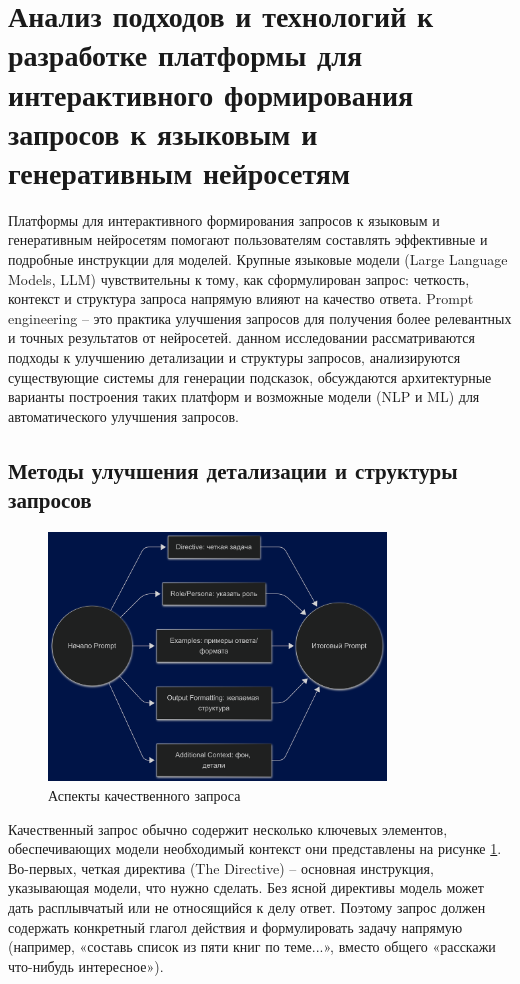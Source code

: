 \section{Анализ подходов и технологий к разработке платформы
для интерактивного формирования запросов к языковым и генеративным
нейросетям}
\label{sec:analysis}
Платформы для интерактивного формирования запросов к языковым и генеративным нейросетям помогают пользователям составлять эффективные и подробные инструкции для моделей. Крупные языковые модели (Large Language Models, LLM) чувствительны к тому, как сформулирован запрос: четкость, контекст и структура запроса напрямую влияют на качество ответа. Prompt engineering – это практика улучшения запросов для получения более релевантных и точных результатов от нейросетей\cite{lakera:2025}. данном исследовании рассматриваются подходы к улучшению детализации и структуры запросов, анализируются существующие системы для генерации подсказок, обсуждаются архитектурные варианты построения таких платформ и возможные модели (NLP и ML) для автоматического улучшения запросов.
\subsection{Методы улучшения детализации и структуры запросов}
\begin{figure}[htbp]
    \centering
    \includegraphics[width=0.8\textwidth]{picture/diploma_prompt_structure.png}
    \caption{Аспекты качественного запроса}
    \label{prompt_quality_props}
\end{figure}
Качественный запрос обычно содержит несколько ключевых элементов, обеспечивающих модели необходимый контекст\cite{learnprompt:promptstructure} они представлены на рисунке \ref{prompt_quality_props}. 
Во-первых, четкая директива (The Directive) – основная инструкция, указывающая модели, что нужно сделать.
Без ясной директивы модель может дать расплывчатый или не относящийся к делу ответ\cite{learnprompt:promptstructure}. Поэтому запрос должен содержать конкретный глагол действия и формулировать задачу напрямую (например, «составь список из пяти книг по теме...», вместо общего «расскажи что-нибудь интересное»).

